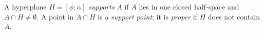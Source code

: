 A hyperplane $H=[\phi;\alpha]$ \emph{supports} $A$ if $A$ lies in one closed half-space and $A\cap H\neq\emptyset$. A point in $A\cap H$ is a \emph{support point}; it is \emph{proper} if $H$ does not contain $A$.
